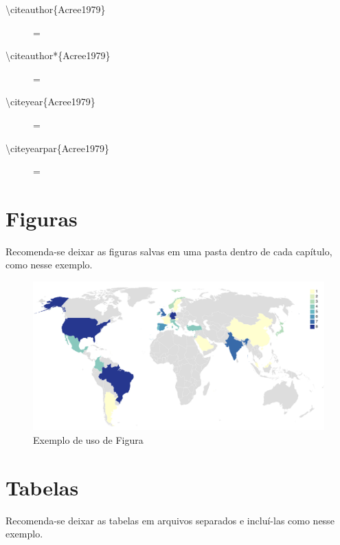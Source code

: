 \begin{description}
   \item [\textbackslash citeauthor\{Acree1979\}] = \citeauthor{Acree1979}
   \item [\textbackslash citeauthor*\{Acree1979\}] = \citeauthor*{Acree1979}
   \item [\textbackslash citeyear\{Acree1979\}] = \citeyear{Acree1979}
   \item [\textbackslash citeyearpar\{Acree1979\}]= \citeyearpar{Acree1979}
\end{description}

\section{Figuras} \label{sec:Cap1-Secao6}
Recomenda-se deixar as figuras salvas em uma pasta dentro de cada capítulo, como nesse exemplo.
\begin{figure}[!ht]
	\centering
	\includegraphics[width=1\textwidth]{Capitulo-1-Exemplo/Figuras/mapa.jpg}
	\caption{Exemplo de uso de Figura}
	\label{Start01}
\end{figure}

\lipsum[1]

\section{Tabelas} \label{sec:Cap1-Secao7}
Recomenda-se deixar as tabelas em arquivos separados e incluí-las como nesse exemplo.


\lipsum[1]

